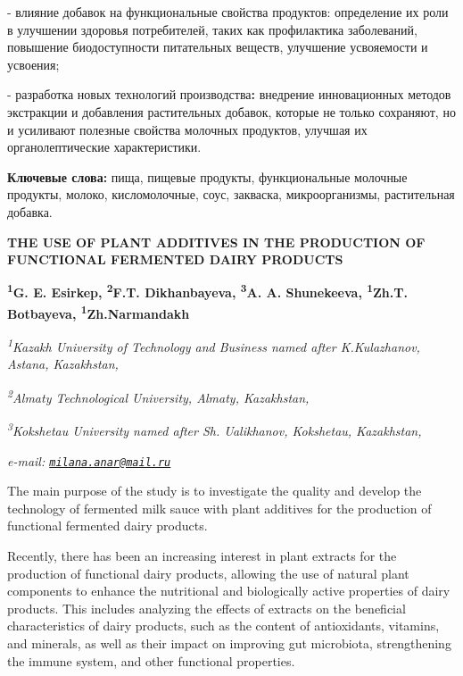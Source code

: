 - влияние добавок на функциональные свойства продуктов:
определение их роли в улучшении здоровья потребителей, таких как
профилактика заболеваний, повышение биодоступности питательных веществ,
улучшение усвояемости и усвоения;

- разработка новых технологий производства{\bfseries :} внедрение
инновационных методов экстракции и добавления растительных добавок,
которые не только сохраняют, но и усиливают полезные свойства молочных
продуктов, улучшая их органолептические характеристики.

{\bfseries Ключевые слова:} пища, пищевые продукты, функциональные молочные
продукты, молоко, кисломолочные, соус, закваска, микроорганизмы,
растительная добавка.

\begin{articleheader}
{\bfseries THE USE OF PLANT ADDITIVES IN THE PRODUCTION OF FUNCTIONAL FERMENTED DAIRY PRODUCTS}

{\bfseries
\textsuperscript{1}G. E. Esirkep\textsuperscript{\envelope },
\textsuperscript{2}F.T. Dikhanbayeva,
\textsuperscript{3}A. A. Shunekeeva,
\textsuperscript{1}Zh.T. Botbayeva,
\textsuperscript{1}Zh.Narmandakh}
\end{articleheader}

\begin{affiliation}
\emph{\textsuperscript{1}Kazakh University of Technology and Business named after K.Kulazhanov, Astana, Kazakhstan,}

\emph{\textsuperscript{2}Almaty Technological University, Almaty, Kazakhstan,}

\emph{\textsuperscript{3}Kokshetau University named after Sh. Ualikhanov, Kokshetau, Kazakhstan,}

\emph{e-mail: \href{mailto:milana.anar@mail.ru}{\nolinkurl{milana.anar@mail.ru}}}
\end{affiliation}

The main purpose of the study is to investigate the quality and develop
the technology of fermented milk sauce with plant additives for the
production of functional fermented dairy products.

Recently, there has been an increasing interest in plant extracts for
the production of functional dairy products, allowing the use of natural
plant components to enhance the nutritional and biologically active
properties of dairy products. This includes analyzing the effects of
extracts on the beneficial characteristics of dairy products, such as
the content of antioxidants, vitamins, and minerals, as well as their
impact on improving gut microbiota, strengthening the immune system, and
other functional properties.

